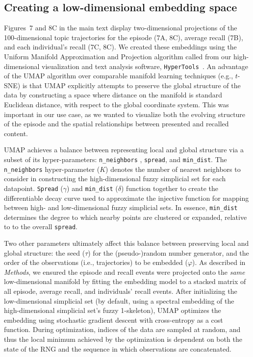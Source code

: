 \documentclass{article}
\begin{document}
\subsection*{Creating a low-dimensional embedding space}
Figures~7 and 8C in the main text display two-dimensional projections of the 100-dimensional topic trajectories for the episode (7A, 8C), average recall (7B), and each individual's recall (7C, 8C).  We created these embeddings using the Uniform Manifold Approximation and Projection algorithm \citep[UMAP;][]{McInEtal18} called from our high-dimensional visualization and text analysis software, \texttt{HyperTools}~\citep{HeusEtal18a}.  An advantage of the UMAP algorithm over comparable manifold learning techniques (e.g., $t$-SNE) is that UMAP explicitly attempts to preserve the global structure of the data \citep{McInEtal18,BechEtal19} by constructing a space where distance on the manifold is standard Euclidean distance, with respect to the global coordinate system.  This was important in our use case, as we wanted to visualize both the evolving structure of the episode and the spatial relationships between presented and recalled content.

UMAP achieves a balance between representing local and global structure via a subset of its hyper-parameters: \texttt{n\_neighbors} , \texttt{spread}, and \texttt{min\_dist}.  The \texttt{n\_neighbors} hyper-parameter ($K$) denotes the number of nearest neighbors to consider in constructing the high-dimensional fuzzy simplicial set for each datapoint.  \texttt{Spread} ($\gamma$) and \texttt{min\_dist} ($\delta$) function together to create the differentiable decay curve used to approximate the injective function for mapping between high- and low-dimensional fuzzy simplicial sets.  In essence, \texttt{min\_dist} determines the degree to which nearby points are clustered or expanded, relative to to the overall \texttt{spread}.

Two other parameters ultimately affect this balance between preserving local and global structure: the seed ($\tau$) for the (pseudo-)random number generator, and the order of the observations (i.e., trajectories) to be embedded ($\varphi$).  As described in \textit{Methods}, we ensured the episode and recall events were projected onto the \textit{same} low-dimensional manifold by fitting the embedding model to a stacked matrix of all episode, average recall, and individuals' recall events.  After initializing the low-dimensional simplicial set (by default, using a spectral embedding of the high-dimensional simplicial set's fuzzy 1-skeleton), UMAP optimizes the embedding using stochastic gradient descent with cross-entropy as a cost function.  During optimization, indices of the data are sampled at random, and thus the local minimum achieved by the optimization is dependent on both the state of the RNG and the sequence in which observations are concatenated.
\end{document}
